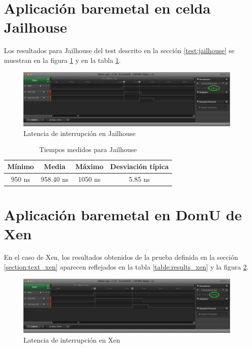 \section{Aplicación baremetal en celda Jailhouse}

Los resultados para Jailhouse del test descrito en la sección \ref{test:jailhouse} se muestran en la figura \ref{fig:resultados:jailhouse} y en la tabla \ref{table:results_jailhouse}.\\

\begin{figure}[!h]
  \centering
  \includegraphics[width=1.0\textwidth]{recursos/jailhouse_1_saleae.png}
  \caption{Latencia de interrupción en Jailhouse}
  \label{fig:resultados:jailhouse}
\end{figure}

\begin{table}[!ht]
  \centering
	\begin{tabular}{ |c|c|c|c| }
		\hline
    Mínimo          & Media      & Máximo  & Desviación típica  \\
    \hline
    950 ns         & 958.40 ns      & 1050 ns    & 5.85 ns	   \\
    \hline
	\end{tabular}
	\caption{Tiempos medidos para Jailhouse}
  \label{table:results_jailhouse}
\end{table}

\section{Aplicación baremetal en DomU de Xen}

En el caso de Xen, los resultados obtenidos de la prueba definida en la sección \ref{section:text_xen} aparecen reflejados en la tabla \ref{table:results_xen} y la figura \ref{fig:resultados:xen}.\\

\begin{figure}[!h]
  \centering
  \includegraphics[width=1.0\textwidth]{recursos/xen_1_saleae.png}
  \caption{Latencia de interrupción en Xen}
  \label{fig:resultados:xen}
\end{figure}

